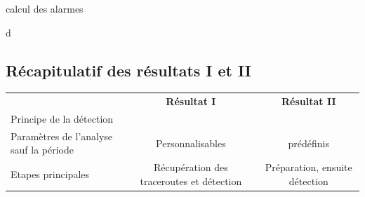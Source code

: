   		\begin{algorithm}
  			\caption{calcul des alarmes  }
  			\begin{algorithmic}[1]
  				\State d
  				\EndFunction
  			\end{algorithmic}
  			\label{algo:step-alarmsDetection}
  		\end{algorithm}
  		
  		\subsection{Récapitulatif  des résultats I et II}
  		
  		\begin{table}
  			
  			\begin{tabularx}{}{ l c c}
  				\hline
  				&\textbf{Résultat I}& \textbf{Résultat II} \\
  				Principe de la détection &  &\\
  				Paramètres de l'analyse sauf la période &Personnalisables& prédéfinis\\
  				Etapes principales & Récupération des traceroutes et détection&Préparation, ensuite détection\\
  				
  			\end{tabularx}
  		\end{table}